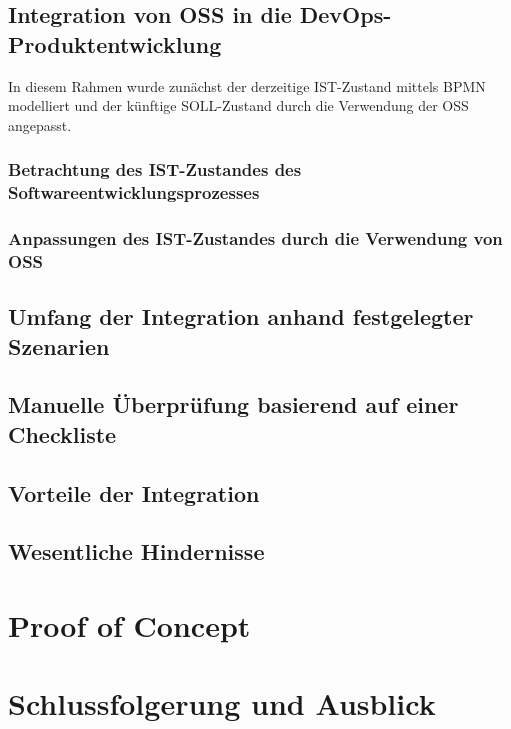 \documentclass[12pt,titlepage]{article}
\begin{document}
\subsection{Integration von OSS in die DevOps-Produktentwicklung}
In diesem Rahmen wurde zunächst der derzeitige IST-Zustand mittels BPMN modelliert und der künftige SOLL-Zustand durch die Verwendung der OSS angepasst.

\subsubsection{Betrachtung des IST-Zustandes des Softwareentwicklungsprozesses}


\newpage
\subsubsection{Anpassungen des IST-Zustandes durch die Verwendung von OSS}


\subsection{Umfang der Integration anhand festgelegter Szenarien}


\subsection{Manuelle Überprüfung basierend auf einer Checkliste}


\subsection{Vorteile der Integration}


\subsection{Wesentliche Hindernisse}



\section{Proof of Concept}




\section{Schlussfolgerung und Ausblick}






\newpage


\end{document}
